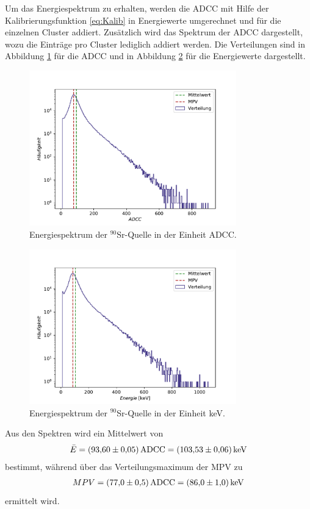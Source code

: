 \FloatBarrier
Um das Energiespektrum zu erhalten, werden die ADCC mit Hilfe der Kalibrierungsfunktion \eqref{eq:Kalib} in Energiewerte umgerechnet und für die einzelnen Cluster addiert.
Zusätzlich wird das Spektrum der ADCC dargestellt, wozu die Einträge pro Cluster lediglich addiert werden.
Die Verteilungen sind in Abbildung \ref{fig:spektrumADCC} für die ADCC und in Abbildung \ref{fig:spektrumkeV} für die Energiewerte dargestellt.

\begin{figure}
  \centering
  \includegraphics[width=0.8\textwidth]{plots/spectrum_adc.pdf}
  \caption{Energiespektrum der $^{90}$Sr-Quelle in der Einheit ADCC.}
  \label{fig:spektrumADCC}
\end{figure}

\begin{figure}
  \centering
  \includegraphics[width=0.8\textwidth]{plots/spectrum_keV.pdf}
  \caption{Energiespektrum der $^{90}$Sr-Quelle in der Einheit keV.}
  \label{fig:spektrumkeV}
\end{figure}
\FloatBarrier

Aus den Spektren wird ein Mittelwert von
\begin{align*}
  \bar{E} = \SI{93.60 \pm 0.05}{ADCC} = \SI{103.53 \pm 0.06}{\kilo\electronvolt}
\end{align*}
bestimmt, während über das Verteilungsmaximum der MPV zu
\begin{align*}
  MPV =  \SI{77 \pm 0.5}{ADCC} = \SI{86.0 \pm 1.0}{\kilo\electronvolt}
\end{align*}
ermittelt wird.
